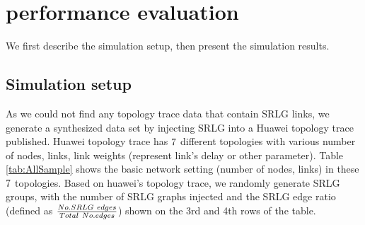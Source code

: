 \section{performance evaluation}
\label{sec:performance evaluation}
We first describe the simulation setup, then present the simulation results.
\subsection{Simulation setup}
As we could not find any topology trace data that contain SRLG links, we generate a synthesized data  set by injecting SRLG into a Huawei topology trace published. Huawei topology trace has $7$ different topologies with various number of nodes, links, link weights (represent link's delay or other parameter). Table \ref{tab:AllSample} shows the basic network setting (number of nodes, links) in these $7$ topologies. Based on huawei's topology trace, we randomly generate SRLG groups, with the number of SRLG graphs injected and the SRLG edge ratio (defined as $\frac{{No.SRLG \  {\rm{ }}edges}}{{Total \  {\rm{ }}No.edges}}$) shown on the 3rd and 4th rows of the table.





